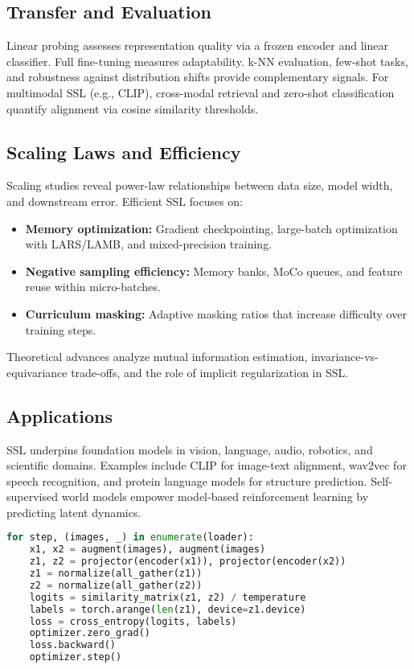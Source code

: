 \documentclass{article}
\begin{document}
\subsection{Transfer and Evaluation}
Linear probing assesses representation quality via a frozen encoder and linear classifier. Full fine-tuning measures adaptability. k-NN evaluation, few-shot tasks, and robustness against distribution shifts provide complementary signals. For multimodal SSL (e.g., CLIP), cross-modal retrieval and zero-shot classification quantify alignment via cosine similarity thresholds.

\subsection{Scaling Laws and Efficiency}
Scaling studies reveal power-law relationships between data size, model width, and downstream error. Efficient SSL focuses on:
\begin{itemize}
  \item \textbf{Memory optimization:} Gradient checkpointing, large-batch optimization with LARS/LAMB, and mixed-precision training.
  \item \textbf{Negative sampling efficiency:} Memory banks, MoCo queues, and feature reuse within micro-batches.
  \item \textbf{Curriculum masking:} Adaptive masking ratios that increase difficulty over training steps.
\end{itemize}
Theoretical advances analyze mutual information estimation, invariance-vs-equivariance trade-offs, and the role of implicit regularization in SSL.

\subsection{Applications}
SSL underpins foundation models in vision, language, audio, robotics, and scientific domains. Examples include CLIP for image-text alignment, wav2vec for speech recognition, and protein language models for structure prediction. Self-supervised world models empower model-based reinforcement learning by predicting latent dynamics.

\begin{lstlisting}[language=Python, caption={SimCLR-style training loop with distributed negatives.}]
for step, (images, _) in enumerate(loader):
    x1, x2 = augment(images), augment(images)
    z1, z2 = projector(encoder(x1)), projector(encoder(x2))
    z1 = normalize(all_gather(z1))
    z2 = normalize(all_gather(z2))
    logits = similarity_matrix(z1, z2) / temperature
    labels = torch.arange(len(z1), device=z1.device)
    loss = cross_entropy(logits, labels)
    optimizer.zero_grad()
    loss.backward()
    optimizer.step()
\end{lstlisting}
\FloatBarrier
\end{document}
